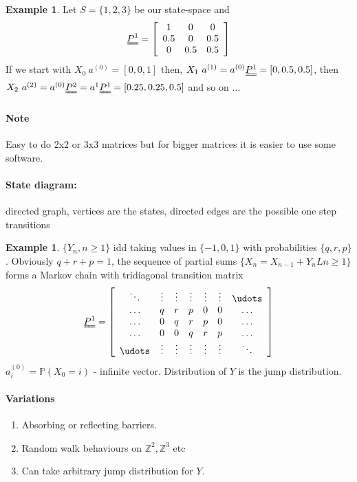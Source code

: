 \documentclass{article}
\theoremstyle{definition}
\newtheorem{ex}[thm]{Example}
\begin{document}
\begin{ex} Let $S = \{1, 2, 3\}$ be our state-space and
\[
\uuline{P^{1}} =  \left [ \begin{array}{ccc}
1 & 0 & 0\\ 0.5 & 0 & 0.5\\ 0 & 0.5 & 0.5 \end{array} \right ]
\]
If we start with $X_0 ~ a^{(0)} = [ 0,0,1 ]$ then, $X_1 ~ a^{(1)} = a^{(0)} \uuline{P^{1}} = [0,0.5,0.5]$, then $X_2 ~ a^{(2)} = a^{(0)} \uuline{P^{2}} = a^{1}\uuline{P^1} = [ 0.25, 0.25, 0.5 ]$ and so on $\ldots$
\end{ex}

\paragraph*{Note} Easy to do 2x2 or 3x3 matrices but for bigger matrices it is easier to use some software.

\paragraph*{State diagram:} directed graph, vertices are the states, directed edges are the possible one step transitions

\begin{ex} $\{Y_n, n \geq 1 \}$ idd taking values in $\{-1, 0, 1\}$ with probabilities $\{q, r, p\}$. Obviously $q + r + p = 1$, the sequence of partial sums $\{X_n = X_{n-1} + Y_n L n \geq 1\}$ forms a Markov chain with tridiagonal transition matrix
\[
\uuline{P^1} = \left [ \begin{array}{ccccccc}
\ddots & \vdots & \vdots & \vdots & \vdots & \vdots & \udots\\
\hdots & q & r & p & 0 & 0 & \hdots\\
\hdots & 0 & q & r & p & 0 & \hdots\\
\hdots & 0 & 0 & q & r & p & \hdots\\
\udots & \vdots & \vdots & \vdots & \vdots & \vdots & \ddots\\
\end{array} \right ]
\]
$a_i^{(0)} = \mathbb{P}(X_0 = i)$ - infinite vector. Distribution of $Y$ is the jump distribution.
\end{ex}

\paragraph*{Variations}
\begin{enumerate}
\item
Absorbing or reflecting barriers.
\item
Random walk behaviours on $\mathbb{Z}^2, \mathbb{Z}^3$ etc
\item
Can take arbitrary jump distribution for $Y$.
\end{enumerate}
\end{document}
